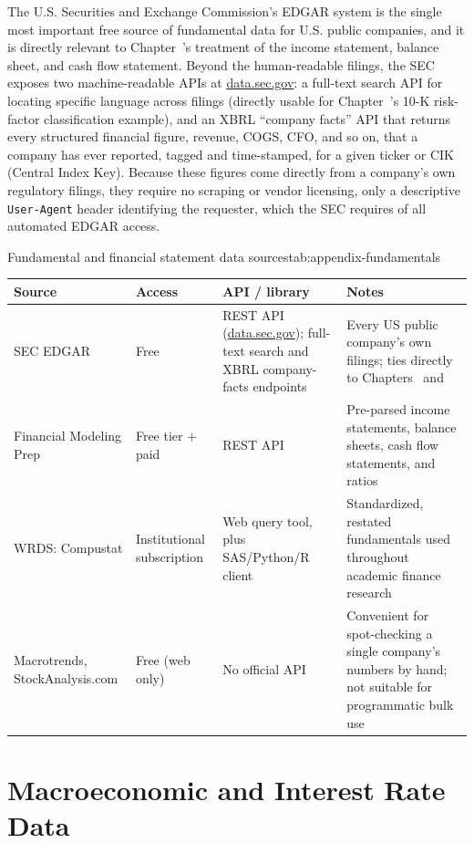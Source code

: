 \documentclass[../ai_in_finance]{subfiles}
\begin{document}
The U.S. Securities and Exchange Commission's EDGAR system is the single most important free source of fundamental data for U.S. public companies, and it is directly relevant to Chapter~'s treatment of the income statement, balance sheet, and cash flow statement. Beyond the human-readable filings, the SEC exposes two machine-readable APIs at \url{data.sec.gov}: a full-text search API for locating specific language across filings (directly usable for Chapter~'s 10-K risk-factor classification example), and an XBRL ``company facts'' API that returns every structured financial figure, revenue, COGS, CFO, and so on, that a company has ever reported, tagged and time-stamped, for a given ticker or CIK (Central Index Key). Because these figures come directly from a company's own regulatory filings, they require no scraping or vendor licensing, only a descriptive \texttt{User-Agent} header identifying the requester, which the SEC requires of all automated EDGAR access.

\begin{booktable}[htbp]{Fundamental and financial statement data sources}{tab:appendix-fundamentals}
\begin{tabular}{L{3.0cm}L{2.2cm}L{3.6cm}L{4.0cm}}
\toprule
Source & Access & API / library & Notes \\
\midrule
SEC EDGAR & Free & REST API (\url{data.sec.gov}); full-text search and XBRL company-facts endpoints & Every US public company's own filings; ties directly to Chapters~ and~ \\
Financial Modeling Prep & Free tier + paid & REST API & Pre-parsed income statements, balance sheets, cash flow statements, and ratios \\
WRDS: Compustat & Institutional subscription & Web query tool, plus SAS/Python/R client & Standardized, restated fundamentals used throughout academic finance research \\
Macrotrends, StockAnalysis.com & Free (web only) & No official API & Convenient for spot-checking a single company's numbers by hand; not suitable for programmatic bulk use \\
\bottomrule
\end{tabular}
\end{booktable}

\section{Macroeconomic and Interest Rate Data}
\end{document}
